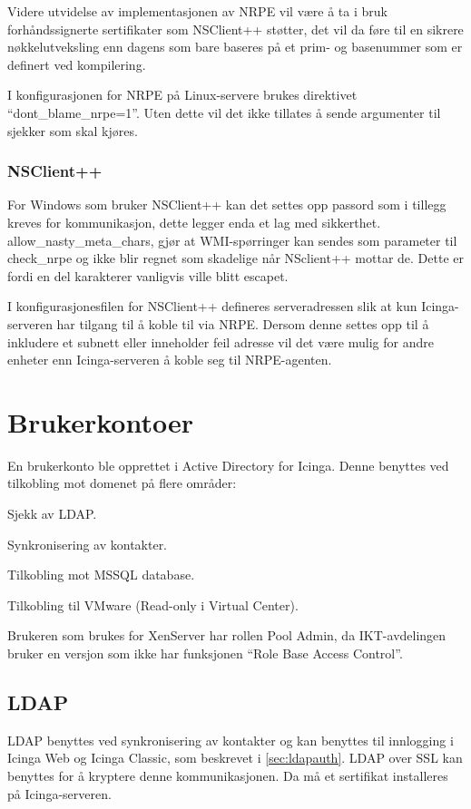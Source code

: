 Videre utvidelse av implementasjonen av NRPE vil være å ta i bruk forhåndssignerte sertifikater 
som NSClient++ støtter, det vil da føre til en sikrere nøkkelutveksling enn dagens som bare baseres på et prim- og basenummer som er definert ved kompilering.

I konfigurasjonen for NRPE på Linux-servere brukes direktivet ``dont\_blame\_nrpe=1''. Uten dette vil det ikke tillates å sende argumenter til sjekker som skal kjøres.
\subsubsection{NSClient++}
For Windows som bruker NSClient++ kan det settes opp passord som i tillegg kreves for kommunikasjon, dette legger enda et lag med sikkerthet.
allow\_nasty\_meta\_chars, gjør at WMI-spørringer kan sendes som parameter til check\_nrpe og ikke blir regnet som skadelige når NSclient++ mottar de. Dette er fordi en del karakterer vanligvis ville blitt escapet.

I konfigurasjonesfilen for NSClient++ defineres serveradressen slik at kun Icinga-serveren har tilgang til å koble til via NRPE. Dersom denne settes opp til å inkludere et subnett eller inneholder feil adresse vil det være mulig for andre enheter enn Icinga-serveren å koble seg til NRPE-agenten.

\section{Brukerkontoer}
En brukerkonto ble opprettet i Active Directory for Icinga. Denne benyttes ved tilkobling mot domenet på flere områder:
\begin{itemize*}
	\item Sjekk av LDAP.
	\item Synkronisering av kontakter.
	\item Tilkobling mot MSSQL database.
	\item Tilkobling til VMware (Read-only i Virtual Center).
\end{itemize*}
Brukeren som brukes for XenServer har rollen Pool Admin, da IKT-avdelingen bruker en versjon som ikke har funksjonen ``Role Base Access Control''. 

\subsection{LDAP}
LDAP benyttes ved synkronisering av kontakter og kan benyttes til innlogging i Icinga Web og Icinga Classic, som beskrevet i \ref{sec:ldapauth}. LDAP over SSL kan benyttes for å kryptere denne kommunikasjonen. Da må et sertifikat installeres på Icinga-serveren.
